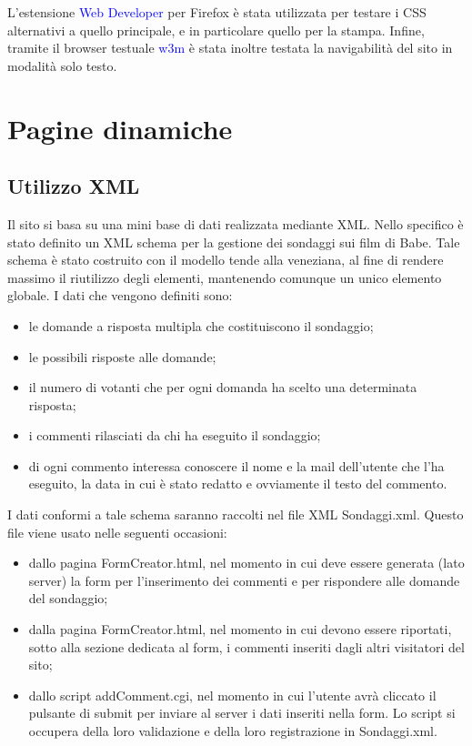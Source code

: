 \documentclass[10pt,a4paper,onecolumn]{article}
\newcommand{\progname}[1]{\textcolor{blue}{\textsf{#1}}}
\begin{document}
L'estensione \progname{Web Developer} per Firefox è stata utilizzata per testare i CSS alternativi a quello principale, e in particolare quello per la stampa. Infine, tramite il browser testuale \progname{w3m} è stata inoltre testata la navigabilità del sito in modalità solo testo. 

\section{Pagine dinamiche}

\subsection{Utilizzo XML}

Il sito si basa su una mini base di dati realizzata mediante XML. Nello specifico è stato definito un XML schema per la gestione dei sondaggi sui film di Babe. Tale schema è stato costruito con il modello tende alla veneziana, al fine di rendere massimo il riutilizzo degli elementi, mantenendo comunque un unico elemento globale. I dati che vengono definiti sono:

\begin{itemize}
	\item le domande a risposta multipla che costituiscono il sondaggio;
	\item le possibili risposte alle domande;
	\item il numero di votanti che per ogni domanda ha scelto una determinata risposta;
	\item i commenti rilasciati da chi ha eseguito il sondaggio;
	\item di ogni commento interessa conoscere il nome e la mail dell'utente che l'ha eseguito, la data in cui è stato redatto e ovviamente il testo del commento.
\end{itemize}

I dati conformi a tale schema saranno raccolti nel file XML Sondaggi.xml. Questo file viene usato nelle seguenti occasioni:

\begin{itemize}
	\item dallo pagina FormCreator.html, nel momento in cui deve essere generata (lato server) la form per l'inserimento dei commenti e per rispondere alle domande del sondaggio;
	\item dalla pagina FormCreator.html, nel momento in cui devono essere riportati, sotto alla sezione dedicata al form, i commenti inseriti dagli altri visitatori del sito;
	\item dallo script addComment.cgi, nel momento in cui l'utente avrà cliccato il pulsante di submit per inviare al server i dati inseriti nella form. Lo script si occupera della loro validazione e della loro registrazione in Sondaggi.xml.
\end{itemize}
\end{document}
